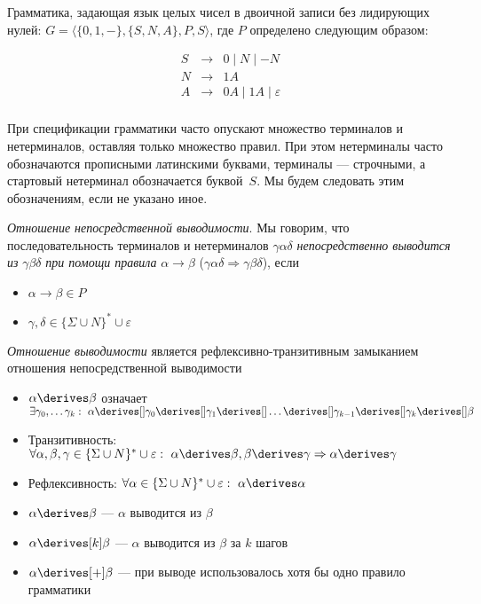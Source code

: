 \begin{example}
Грамматика, задающая язык целых чисел в двоичной записи без лидирующих нулей: $G = \langle \{0, 1, -\}, \{S, N, A\}, P, S \rangle$, где $P$ определено следующим образом:

\[
\begin{array}{rcl}
S& \rightarrow & 0 \mid N \mid - N  \\
N& \rightarrow & 1 A \\
A& \rightarrow & 0 A \mid 1 A  \mid \varepsilon\\
\end{array}
\]
\end{example}

При спецификации грамматики часто опускают множество терминалов и нетерминалов, оставляя только множество правил. При этом нетерминалы часто обозначаются прописными латинскими буквами, терминалы --- строчными, а стартовый нетерминал обозначается буквой~$S$. Мы будем следовать этим обозначениям, если не указано иное.


\begin{definition}\label{def derivability in CFG}
  \textit{Отношение непосредственной выводимости}. Мы говорим, что последовательность терминалов и нетерминалов $\gamma \alpha \delta$ \textit{непосредственно выводится из} $\gamma \beta \delta$ \textit{при помощи правила} $\alpha \rightarrow \beta$ ($\gamma \alpha \delta \Rightarrow \gamma \beta \delta$), если
  \begin{itemize}
    \item $\alpha \rightarrow \beta \in P$
    \item $\gamma, \delta \in \{\Sigma \cup N\}^* \cup {\varepsilon}$
  \end{itemize}
\end{definition}

\begin{definition}
\textit{Отношение выводимости} является рефлексивно-транзитивным замыканием отношения непосредственной выводимости
\begin{itemize}
  \item $\alpha \derives \beta$ означает $\exists \gamma_0, \dots \gamma_k: \ \alpha \derives[] \gamma_0 \derives[] \gamma_1 \derives[] \dots \derives[] \gamma_{k-1} \derives[] \gamma_{k} \derives[] \beta$
  \item Транзитивность: $\forall \alpha, \beta, \gamma \in \{\Sigma \cup N\}^* \cup {\varepsilon}: \ \alpha \derives \beta, \beta \derives \gamma \Rightarrow \alpha \derives \gamma$
  \item Рефлексивность: $\forall \alpha \in \{\Sigma \cup N\}^* \cup {\varepsilon}: \ \alpha \derives \alpha$
  \item $\alpha \derives \beta$ --- $\alpha$ выводится из $\beta$
  \item $\alpha \derives[k] \beta$ --- $\alpha$ выводится из $\beta$ за $k$ шагов
  \item $\alpha \derives[+] \beta$ --- при выводе использовалось хотя бы одно правило грамматики
\end{itemize}
\end{definition}


